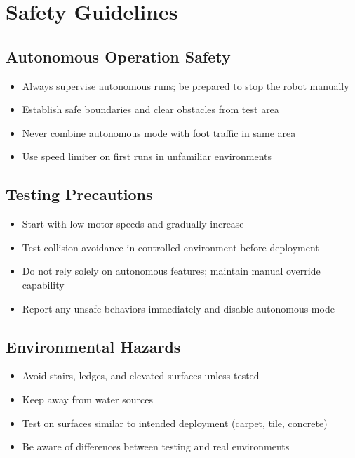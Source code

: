 %
%

\chapter{Safety Guidelines}

\section{Autonomous Operation Safety}

\begin{itemize}
    \item Always supervise autonomous runs; be prepared to stop the robot manually
    \item Establish safe boundaries and clear obstacles from test area
    \item Never combine autonomous mode with foot traffic in same area
    \item Use speed limiter on first runs in unfamiliar environments
\end{itemize}

\section{Testing Precautions}

\begin{itemize}
    \item Start with low motor speeds and gradually increase
    \item Test collision avoidance in controlled environment before deployment
    \item Do not rely solely on autonomous features; maintain manual override capability
    \item Report any unsafe behaviors immediately and disable autonomous mode
\end{itemize}

\section{Environmental Hazards}

\begin{itemize}
    \item Avoid stairs, ledges, and elevated surfaces unless tested
    \item Keep away from water sources
    \item Test on surfaces similar to intended deployment (carpet, tile, concrete)
    \item Be aware of differences between testing and real environments
\end{itemize}

